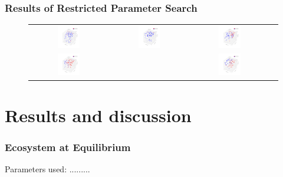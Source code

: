 \documentclass{beamer}
\begin{document}
\frame
{
  \frametitle{Results of Restricted Parameter Search}
  \begin{figure}[H]
  \centering
        \begin{tabular}{@{}cc@{}cc@{}}
                \includegraphics[width = 0.3\textwidth]{./pics/Restricted_Parameter_space_d2500_w250.png} &
                \includegraphics[width = 0.3\textwidth]{./pics/Restricted_Parameter_space_d3000_w500.png} &
                \includegraphics[width = 0.3\textwidth]{./pics/Restricted_Parameter_space_d2000_w2000.png} \\
                \includegraphics[width = 0.3\textwidth]{./pics/Restricted_Parameter_space_d500_w3000.png} &&
		\includegraphics[width = 0.3\textwidth]{./pics/Restricted_Parameter_space_d250_w2500.png} \\
        \end{tabular}
        \label{RestrictParam}
  \end{figure}


}



\section{Results and discussion}
\frame
{
  \frametitle{Ecosystem at Equilibrium}
  Parameters used:  .........



  
}
\end{document}
